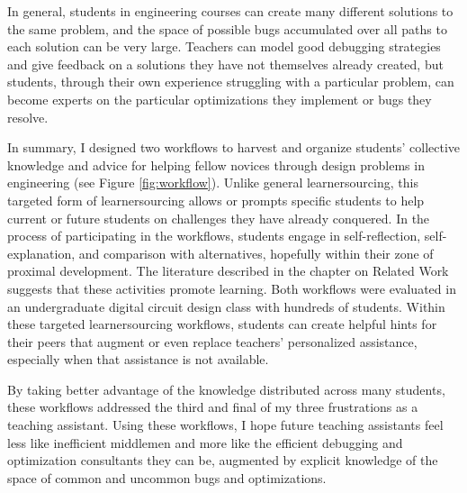 In general, students in engineering courses can create many different solutions to the same problem, and the space of possible bugs accumulated over all paths to each solution can be very large. Teachers can model good debugging strategies and give feedback on a solutions they have not themselves already created, but students, through their own experience struggling with a particular problem, can become experts on the particular optimizations they implement or bugs they resolve. %

In summary, I designed two workflows to harvest and organize students' collective knowledge and advice for helping fellow novices through design problems in engineering (see Figure \ref{fig:workflow}). Unlike general learnersourcing, this targeted form of learnersourcing allows or prompts specific students to help current or future students on challenges they have already conquered. In the process of participating in the workflows, students engage in self-reflection, self-explanation, and comparison with alternatives, hopefully within their zone of proximal development. The literature described in the chapter on Related Work suggests that these activities promote learning. Both workflows were evaluated in an undergraduate digital circuit design class with hundreds of students. Within these targeted learnersourcing workflows, students can create helpful hints for their peers that augment or even replace teachers' personalized assistance, especially when that assistance is not available. 

By taking better advantage of the knowledge distributed across many students, these workflows addressed the third and final of my three frustrations as a teaching assistant. Using these workflows, I hope future teaching assistants feel less like inefficient middlemen and more like the efficient debugging and optimization consultants they can be, augmented by explicit knowledge of the space of common and uncommon bugs and optimizations.%




